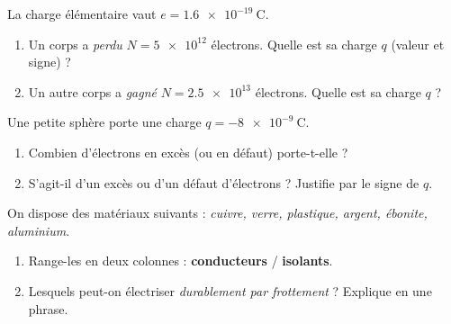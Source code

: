 \documentclass[11pt,a4paper]{article}
\begin{document}

\begin{exo}
La charge élémentaire vaut $e = \num{1.6e-19}\ \si{\coulomb}$.
\begin{enumerate}[label=\alph*)]
  \item Un corps a \emph{perdu} $N = \num{5e12}$ électrons. Quelle est sa charge $q$ (valeur et
        signe) ?
  \item Un autre corps a \emph{gagné} $N = \num{2.5e13}$ électrons. Quelle est sa charge $q$ ?
\end{enumerate}
\end{exo}

\begin{exo}
Une petite sphère porte une charge $q = \SI{-8e-9}{\coulomb}$.
\begin{enumerate}[label=\alph*)]
  \item Combien d'électrons en excès (ou en défaut) porte-t-elle ?
  \item S'agit-il d'un excès ou d'un défaut d'électrons ? Justifie par le signe de $q$.
\end{enumerate}
\end{exo}

\begin{exo}
On dispose des matériaux suivants : \emph{cuivre, verre, plastique, argent, ébonite, aluminium}.
\begin{enumerate}[label=\alph*)]
  \item Range-les en deux colonnes : \textbf{conducteurs} / \textbf{isolants}.
  \item Lesquels peut-on électriser \emph{durablement par frottement} ? Explique en une phrase.
\end{enumerate}
\end{exo}
\end{document}
